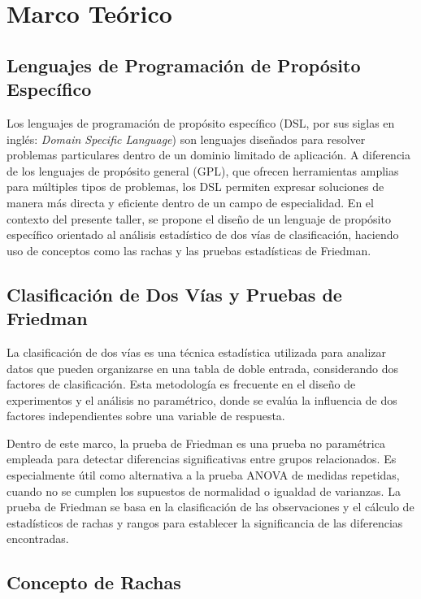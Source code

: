 \documentclass{article}
\begin{document}
\section{Marco Teórico}

\subsection*{Lenguajes de Programación de Propósito Específico}

Los lenguajes de programación de propósito específico (DSL, por sus siglas en inglés: \textit{Domain Specific Language}) son lenguajes diseñados para resolver problemas particulares dentro de un dominio limitado de aplicación. A diferencia de los lenguajes de propósito general (GPL), que ofrecen herramientas amplias para múltiples tipos de problemas, los DSL permiten expresar soluciones de manera más directa y eficiente dentro de un campo de especialidad. En el contexto del presente taller, se propone el diseño de un lenguaje de propósito específico orientado al análisis estadístico de dos vías de clasificación, haciendo uso de conceptos como las rachas y las pruebas estadísticas de Friedman.

\subsection*{Clasificación de Dos Vías y Pruebas de Friedman}

La clasificación de dos vías es una técnica estadística utilizada para analizar datos que pueden organizarse en una tabla de doble entrada, considerando dos factores de clasificación. Esta metodología es frecuente en el diseño de experimentos y el análisis no paramétrico, donde se evalúa la influencia de dos factores independientes sobre una variable de respuesta.

Dentro de este marco, la prueba de Friedman es una prueba no paramétrica empleada para detectar diferencias significativas entre grupos relacionados. Es especialmente útil como alternativa a la prueba ANOVA de medidas repetidas, cuando no se cumplen los supuestos de normalidad o igualdad de varianzas. La prueba de Friedman se basa en la clasificación de las observaciones y el cálculo de estadísticos de rachas y rangos para establecer la significancia de las diferencias encontradas.

\subsection*{Concepto de Rachas}
\end{document}
